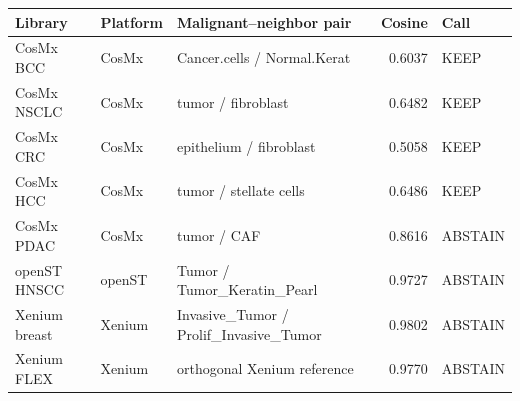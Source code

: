 \begin{tabular}{lllrl}
\toprule
Library & Platform & Malignant--neighbor pair & Cosine & Call \\
\midrule
CosMx BCC & CosMx & Cancer.cells / Normal.Kerat & 0.6037 & KEEP \\
CosMx NSCLC & CosMx & tumor / fibroblast & 0.6482 & KEEP \\
CosMx CRC & CosMx & epithelium / fibroblast & 0.5058 & KEEP \\
CosMx HCC & CosMx & tumor / stellate cells & 0.6486 & KEEP \\
CosMx PDAC & CosMx & tumor / CAF & 0.8616 & ABSTAIN \\
openST HNSCC & openST & Tumor / Tumor\_Keratin\_Pearl & 0.9727 & ABSTAIN \\
Xenium breast & Xenium & Invasive\_Tumor / Prolif\_Invasive\_Tumor & 0.9802 & ABSTAIN \\
Xenium FLEX & Xenium & orthogonal Xenium reference & 0.9770 & ABSTAIN \\
\bottomrule
\end{tabular}
